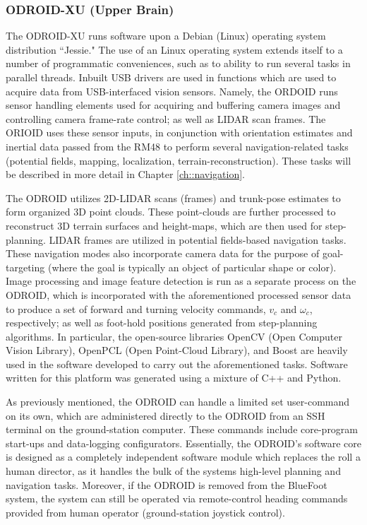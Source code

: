 			\subsubsection{ODROID-XU (Upper Brain)}

			The ODROID-XU runs software upon a Debian (Linux) operating system distribution ``Jessie." The use of an Linux operating system extends itself to a number of programmatic conveniences, such as to ability to run several tasks in parallel threads. Inbuilt USB drivers are used in functions which are used to acquire data from USB-interfaced vision sensors. Namely, the ORDOID runs sensor handling elements used for acquiring and buffering camera images and controlling camera frame-rate control; as well as LIDAR scan frames. The ORIOID uses these sensor inputs, in conjunction with orientation estimates and inertial data passed from the RM48 to perform several navigation-related tasks (\EG potential fields, mapping, localization, terrain-reconstruction). These tasks will be described in more detail in Chapter \ref{ch::navigation}.

			The ODROID utilizes 2D-LIDAR scans (frames) and trunk-pose estimates to form organized 3D point clouds. These point-clouds are further processed to reconstruct 3D terrain surfaces and height-maps, which are then used for step-planning. LIDAR frames are utilized in potential fields-based navigation tasks. These navigation modes also incorporate camera data for the purpose of goal-targeting (where the goal is typically an object of particular shape or color). Image processing and image feature detection is run as a separate process on the ODROID, which is incorporated with the aforementioned processed sensor data to produce a set of forward and turning velocity commands, $v_{c}$ and $\omega_{c}$, respectively; as well as foot-hold positions generated from step-planning algorithms. In particular, the open-source libraries OpenCV (Open Computer Vision Library), OpenPCL (Open Point-Cloud Library), and Boost are heavily used in the software developed to carry out the aforementioned tasks. Software written for this platform was generated using a mixture of C++ and Python.

			As previously mentioned, the ODROID can handle a limited set user-command on its own, which are administered directly to the ODROID from an SSH terminal on the ground-station computer. These commands include core-program start-ups and data-logging configurators. Essentially, the ODROID's software core is designed as a completely independent software module which replaces the roll a human director, as it handles the bulk of the systems high-level planning and navigation tasks. Moreover, if the ODROID is removed from the BlueFoot system, the system can still be operated via remote-control heading commands provided from human operator (\IE ground-station joystick control).
		
